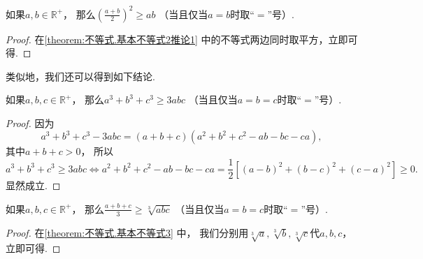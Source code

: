 \begin{corollary}\label{theorem:不等式.基本不等式2推论2}
如果\(a,b\in\mathbb{R}^+\)，
那么\(\left(\frac{a+b}2\right)^2 \geq ab\)
（当且仅当\(a=b\)时取“\(=\)”号）.
\begin{proof}
在\cref{theorem:不等式.基本不等式2推论1} 中的不等式两边同时取平方，立即可得.
\end{proof}
\end{corollary}

类似地，我们还可以得到如下结论.
\begin{theorem}\label{theorem:不等式.基本不等式3}
如果\(a,b,c\in\mathbb{R}^+\)，
那么\(a^3 + b^3 + c^3 \geq 3abc\)
（当且仅当\(a=b=c\)时取“\(=\)”号）.
\begin{proof}
因为\begin{equation*}
	a^3+b^3+c^3-3abc
	= (a+b+c)(a^2+b^2+c^2-ab-bc-ca),
\end{equation*}
其中\(a+b+c>0\)，
所以\begin{equation*}
	a^3 + b^3 + c^3 \geq 3abc
	\iff
	a^2+b^2+c^2-ab-bc-ca
	= \frac12 \left[
		(a-b)^2+(b-c)^2+(c-a)^2
	\right]
	\geq 0.
\end{equation*}
显然成立.
\end{proof}
\end{theorem}

\begin{corollary}\label{theorem:不等式.基本不等式3推论}
如果\(a,b,c\in\mathbb{R}^+\)，
那么\(\frac{a+b+c}{3} \geq \sqrt[3]{abc}\)
（当且仅当\(a=b=c\)时取“\(=\)”号）.
\begin{proof}
在\cref{theorem:不等式.基本不等式3} 中，
我们分别用\(\sqrt[3]{a},\sqrt[3]{b},\sqrt[3]{c}\)代\(a,b,c\)，
立即可得.
\end{proof}
\end{corollary}

